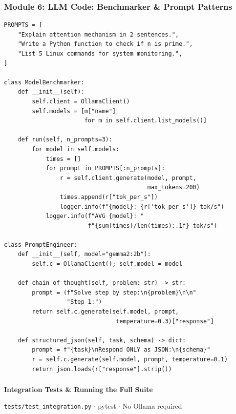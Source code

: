 \begin{frame}[fragile]\frametitle{Module 6: LLM Code: Benchmarker \& Prompt Patterns}
\begin{lstlisting}
PROMPTS = [
    "Explain attention mechanism in 2 sentences.",
    "Write a Python function to check if n is prime.",
    "List 5 Linux commands for system monitoring.",
]

class ModelBenchmarker:
    def __init__(self):
        self.client = OllamaClient()
        self.models = [m["name"]
                       for m in self.client.list_models()]

    def run(self, n_prompts=3):
        for model in self.models:
            times = []
            for prompt in PROMPTS[:n_prompts]:
                r = self.client.generate(model, prompt,
                                         max_tokens=200)
                times.append(r["tok_per_s"])
                logger.info(f"{model}: {r['tok_per_s']} tok/s")
            logger.info(f"AVG {model}: "
                        f"{sum(times)/len(times):.1f} tok/s")

class PromptEngineer:
    def __init__(self, model="gemma2:2b"):
        self.c = OllamaClient(); self.model = model

    def chain_of_thought(self, problem: str) -> str:
        prompt = (f"Solve step by step:\n{problem}\n\n"
                  "Step 1:")
        return self.c.generate(self.model, prompt,
                                temperature=0.3)["response"]

    def structured_json(self, task, schema) -> dict:
        prompt = f"{task}\nRespond ONLY as JSON:\n{schema}"
        r = self.c.generate(self.model, prompt, temperature=0.1)
        return json.loads(r["response"].strip())
\end{lstlisting}
\end{frame}

\begin{frame}[fragile]\frametitle{}
\begin{center}
{\Large \textbf{Integration Tests \& Running the Full Suite}}\

\texttt{tests/test\_integration.py} $\cdot$ pytest $\cdot$ No Ollama required
\end{center}
\end{frame}

